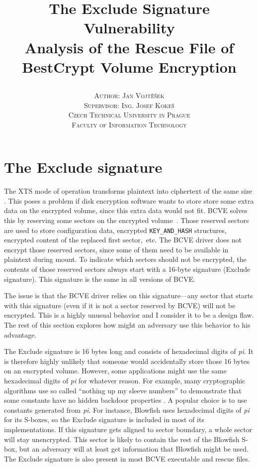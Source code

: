 \documentclass[11pt]{article}
\title{\huge \textbf{The Exclude Signature Vulnerability} \\ \huge Analysis of the Rescue File of BestCrypt Volume Encryption
	\author{\textsc{Author: Jan Vojt{\v e}{\v s}ek} 
		\\ \textsc{Supervisor: Ing. Josef Koke{\v s}}
		\\ \textsc{Czech Technical University in Prague}
		\\ \textsc{Faculty of Information Technology}
}}
\begin{document}
	\maketitle
	\clearpage
	
		
\section{The Exclude signature}
\label{donotencrypt}

The XTS mode of operation transforms plaintext into ciphertext of the same size \cite{ieee_xts}. This poses a problem if disk encryption software wants to store store some extra data on the encrypted volume, since this extra data would not fit. BCVE solves this by reserving some sectors on the encrypted volume~\cite{hornak}. Those reserved sectors are used to store configuration data, encrypted \verb|KEY_AND_HASH| structures, encrypted content of the replaced first sector,~etc. The BCVE driver does not encrypt those reserved sectors, since some of them need to be available in plaintext during mount. To indicate which sectors should not be encrypted, the contents of those reserved sectors always start with a 16-byte signature (Exclude signature). This signature is the same in all versions of BCVE. 

The issue is that the BCVE driver relies on this signature---any sector that starts with this signature (even if it is not a sector reserved by BCVE) will not be encrypted. This is a highly unusual behavior and I consider it to be a design flaw. The rest of this section explores how might an adversary use this behavior to his advantage.

The Exclude signature is 16 bytes long and consists of hexadecimal digits of \textit{pi}. It is therefore highly unlikely that someone would accidentally store those 16 bytes on an encrypted volume. However, some applications might use the same hexadecimal digits of \textit{pi} for whatever reason. For example, many cryptographic algorithms use so called ``nothing up my sleeve numbers'' to demonstrate that some constants have no hidden backdoor properties \cite{crypto}. A popular choice is to use constants generated from \textit{pi}. For instance, Blowfish uses hexadecimal digits of \textit{pi} for its S-boxes, so the Exclude signature is included in most of its implementations. If this signature gets aligned to sector boundary, a whole sector will stay unencrypted. This sector is likely to contain the rest of the Blowfish S-box, but an adversary will at least get information that Blowfish might be used. The Exclude signature is also present in most BCVE executable and rescue files. 
\end{document}
